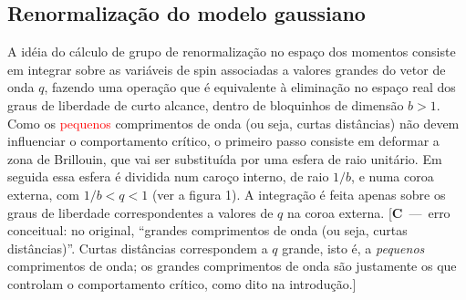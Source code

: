 \documentclass[12pt,a4paper]{article}
\newcommand{\corr}[1]{\textcolor{red}{#1}}
\newcounter{corr}
\newcommand{\nota}[2]{\refstepcounter{corr}\label{#1}%
  {\color{red}\small[\textbf{C\thecorr}~---~#2]}}
\begin{document}
\subsection{Renormalização do modelo gaussiano}

A idéia do cálculo de grupo de renormalização no espaço dos momentos
consiste em integrar sobre as variáveis de spin associadas a valores grandes
do vetor de onda $q$, fazendo uma operação que é equivalente à eliminação
no espaço real dos graus de liberdade de curto alcance, dentro de bloquinhos
de dimensão $b>1$. Como os \corr{pequenos} comprimentos de onda (ou seja,
curtas distâncias) não devem influenciar o comportamento crítico, o primeiro
passo consiste em deformar a zona de Brillouin, que vai ser substituída por
uma esfera de raio unitário. Em seguida essa esfera é dividida num caroço
interno, de raio $1/b$, e numa coroa externa, com $1/b<q<1$ (ver a figura
1). A integração é feita apenas sobre os graus de liberdade correspondentes
a valores de $q$ na coroa externa.
\nota{c:lambda}{erro conceitual: no original, ``grandes comprimentos de onda (ou seja,
curtas distâncias)''. Curtas distâncias correspondem a $q$ grande, isto é, a \emph{pequenos}
comprimentos de onda; os grandes comprimentos de onda são justamente os que controlam o
comportamento crítico, como dito na introdução.}
\end{document}
